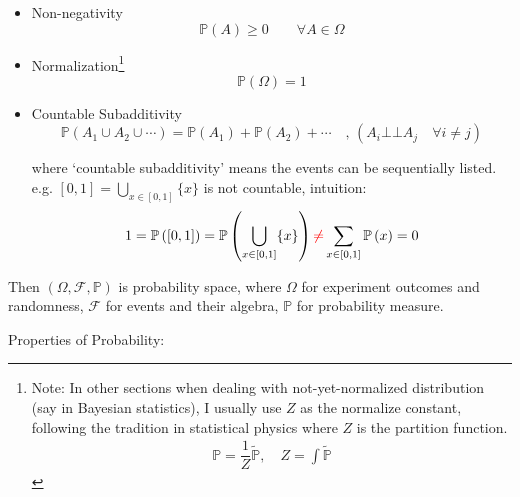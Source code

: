 \begin{itemize}[itemsep=2pt,topsep=-2pt]
\item Non-negativity
\begin{equation}    \mathbb{P}(A)\geq 0\qquad \forall A\in\Omega    
\end{equation}
\item Normalization\footnote{Note: In other sections when dealing with not-yet-normalized distribution (say in Bayesian statistics), I usually use $ Z $ as the normalize constant, following the tradition in statistical physics where $ Z $ is the partition function.
\begin{align}
    \mathbb{P}=\dfrac{1}{Z}\tilde{\mathbb{P}},\quad Z=\int \mathbb{\tilde{P}} 
\end{align}}
\begin{equation}    \mathbb{P}(\Omega)=1    
\end{equation}




\item Countable Subadditivity
\begin{equation}    \mathbb{P}(A_1\cup A_2\cup\cdots)=\mathbb{P}(A_1)+\mathbb{P}(A_2)+\cdots\quad ,\, (A_i\bot\!\!\!\bot  A_j\quad \forall i\neq j)
\end{equation}

where `countable subadditivity' means the events can be sequentially listed. e.g. $ [0,1]=\bigcup _{x\in [0,1]}\{x\} $ is not countable, intuition:
\begin{align}
    1=\mathbb{P}\left( [0,1] \right)=\mathbb{P}\left( \bigcup _{x\in [0,1]}\{x\} \right)   {\color{red}\neq} \sum_{x\in[0,1]}\mathbb{P}\left( x \right) =0
\end{align}


\end{itemize}

    Then $(\Omega,\mathscr{F},\mathbb{P})$ is probability space, where $ \Omega  $ for experiment outcomes and randomness, $ \mathscr{F} $ for events and their algebra, $ \mathbb{P} $ for probability measure.

\begin{point}
        Properties of Probability:
\end{point}

